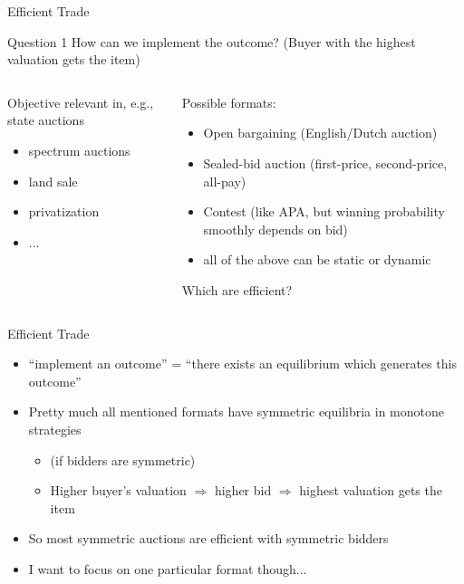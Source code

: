\documentclass[english,10pt
,aspectratio=169
]{beamer}
\begin{document}
\begin{frame}{Efficient Trade}
	\begin{block}{Question 1}
		How can we implement the  outcome? (Buyer with the highest valuation gets the item)
	\end{block}
	\bigskip
	\begin{columns}[T]
		\begin{column}{0.4\linewidth}
			Objective relevant in, e.g., state auctions
			\begin{itemize}
				\item spectrum auctions
				\item land sale
				\item privatization 
				\item ...
			\end{itemize}
		\end{column}
		\begin{column}{0.55\linewidth}
			Possible formats:
			\pause
			\begin{itemize}
				\item Open bargaining (English/Dutch auction)
				\item Sealed-bid auction (first-price, second-price, all-pay)
				\item Contest (like APA, but winning probability smoothly depends on bid)
				\item all of the above can be static or dynamic
			\end{itemize}
			\pause
			Which are efficient?
		\end{column}
	\end{columns}
\end{frame}


\begin{frame}{Efficient Trade}
	\begin{itemize}
		\item ``implement an outcome'' = ``there exists an equilibrium which generates this outcome''
		\item Pretty much all mentioned formats have symmetric equilibria in monotone strategies
		\begin{itemize}
			\item (if bidders are symmetric)
			\pause
			\item Higher buyer's valuation $\Rightarrow$ higher bid $\Rightarrow$ highest valuation gets the item
		\end{itemize}
		\item So most symmetric auctions are efficient with symmetric bidders
		\item I want to focus on one particular format though...
	\end{itemize}
\end{frame}
\end{document}
